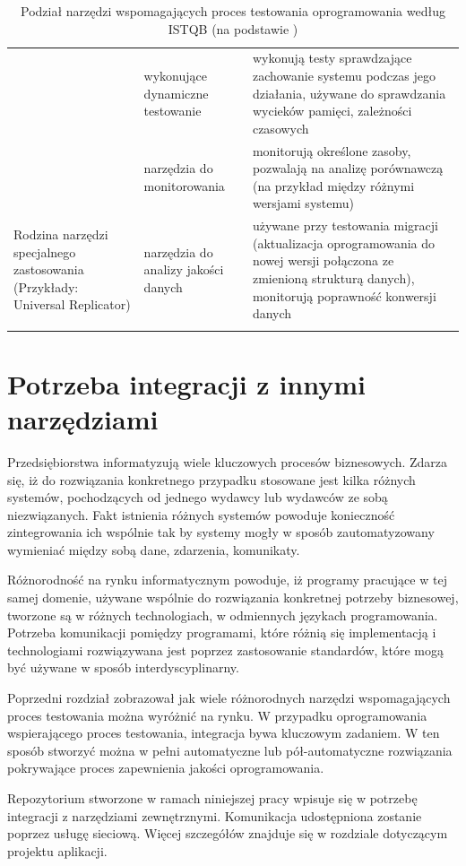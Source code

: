 \begin{longtable}{| p{4cm} | p{4cm} | p{8cm} |}
& wykonujące dynamiczne testowanie & wykonują testy sprawdzające zachowanie systemu podczas jego działania, używane do sprawdzania wycieków pamięci, zależności czasowych \\ \cline{2-3}
& narzędzia do monitorowania & monitorują określone zasoby, pozwalają na analizę porównawczą (na przykład między różnymi wersjami systemu) \\ \hline
\hline
\multirow{1}{4cm}{Rodzina narzędzi specjalnego zastosowania (Przykłady: Universal Replicator\cite{replicator})} &
narzędzia do analizy jakości danych & używane przy testowania migracji (aktualizacja oprogramowania do nowej wersji połączona ze zmienioną strukturą danych), monitorują poprawność konwersji danych \\
\hline
\caption{Podział narzędzi wspomagających proces testowania oprogramowania według ISTQB (na podstawie  \cite{istqb})}\\
\end{longtable}

\section{Potrzeba integracji z innymi narzędziami}

Przedsiębiorstwa informatyzują wiele kluczowych procesów biznesowych. Zdarza się, iż do rozwiązania konkretnego przypadku stosowane jest kilka różnych systemów, pochodzących od jednego wydawcy lub wydawców ze sobą niezwiązanych. Fakt istnienia różnych systemów powoduje konieczność zintegrowania ich wspólnie tak by systemy mogły w sposób zautomatyzowany wymieniać między sobą dane, zdarzenia, komunikaty.

Różnorodność na rynku informatycznym powoduje, iż programy pracujące w tej samej domenie, używane wspólnie do rozwiązania konkretnej potrzeby biznesowej, tworzone są w różnych technologiach, w odmiennych językach programowania. Potrzeba komunikacji pomiędzy programami, które różnią się implementacją i technologiami rozwiązywana jest poprzez zastosowanie standardów, które mogą być używane w sposób interdyscyplinarny.

Poprzedni rozdział zobrazował jak wiele różnorodnych narzędzi wspomagających proces testowania można wyróżnić na rynku. W przypadku oprogramowania wspierającego proces testowania, integracja bywa kluczowym zadaniem. W ten sposób stworzyć można w pełni automatyczne lub pół-automatyczne rozwiązania pokrywające proces zapewnienia jakości oprogramowania. 

Repozytorium stworzone w ramach niniejszej pracy wpisuje się w potrzebę integracji z narzędziami zewnętrznymi. Komunikacja udostępniona zostanie poprzez usługę sieciową. Więcej szczegółów znajduje się w rozdziale dotyczącym projektu aplikacji.

